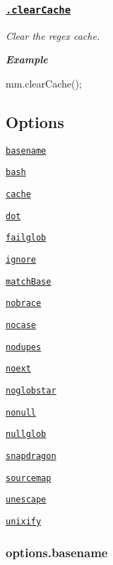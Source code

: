 {\itshape \subsubsection*{\href{index.js#L801}{\tt .clear\+Cache}}}

{\itshape }

{\itshape Clear the regex cache.}

{\itshape {\bfseries Example}}

{\itshape 
\begin{DoxyCode}
mm.clearCache();
\end{DoxyCode}
}

{\itshape \subsection*{Options}}

{\itshape }

{\itshape 
\begin{DoxyItemize}
\item \href{#optionsbasename}{\tt basename}
\item \href{#optionsbash}{\tt bash}
\item \href{#optionscache}{\tt cache}
\item \href{#optionsdot}{\tt dot}
\item \href{#optionsfailglob}{\tt failglob}
\item \href{#optionsignore}{\tt ignore}
\item \href{#optionsmatchBase}{\tt match\+Base}
\item \href{#optionsnobrace}{\tt nobrace}
\item \href{#optionsnocase}{\tt nocase}
\item \href{#optionsnodupes}{\tt nodupes}
\item \href{#optionsnoext}{\tt noext}
\item \href{#optionsnoglobstar}{\tt noglobstar}
\item \href{#optionsnonull}{\tt nonull}
\item \href{#optionsnullglob}{\tt nullglob}
\item \href{#optionssnapdragon}{\tt snapdragon}
\item \href{#optionssourcemap}{\tt sourcemap}
\item \href{#optionsunescape}{\tt unescape}
\item \href{#optionsunixify}{\tt unixify}
\end{DoxyItemize}}

{\itshape \subsubsection*{options.\+basename}}

